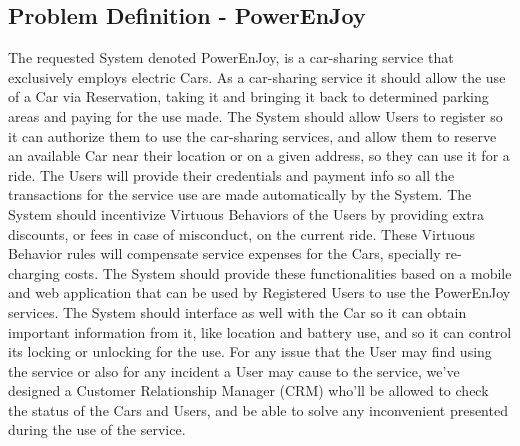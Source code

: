 \documentclass[a4paper]{article}
\begin{document}
\subsection{Problem Definition - PowerEnJoy}
The requested System denoted PowerEnJoy, is a car-sharing service that  exclusively employs electric Cars. 
\newline\newline
As a car-sharing service it should allow the use of a Car via Reservation, taking it and bringing it back to determined parking areas and paying for the use made.
\newline\newline
The System should allow Users to register so it can authorize them to use the car-sharing services, and allow them to reserve an available Car near their location or on a given address, so they can use it for a ride. 
\newline\newline
The Users will provide their credentials and payment info so all the transactions for the service use are made automatically by the System.
\newline\newline
The System should incentivize Virtuous Behaviors of the Users by providing extra discounts, or fees in case of misconduct, on the current ride. These Virtuous Behavior rules will compensate service expenses for the Cars, specially re-charging costs.
\newline\newline
The System should provide these functionalities based on a mobile and web application that can be used by Registered Users to use the PowerEnJoy services. The System should interface as well with the Car so it can obtain important information from it, like location and battery use, and so it can control its locking or unlocking for the use.
\newline\newline
For any issue that the User may find using the service or also for any incident a User may cause to the service, we've designed a Customer Relationship Manager (CRM) who'll be allowed to check the status of the Cars and Users, and be able to solve any inconvenient presented during the use of the service. 

\newpage
\end{document}
